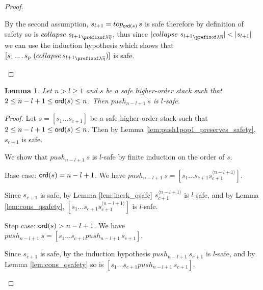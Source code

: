 \documentclass[a4paper]{article}
\newtheorem{lemma}{Lemma}[section]
\theoremstyle{remark}
\theoremstyle{definition}
\begin{document}
\begin{proof}
\begin{itemize}
By the second assumption, $s_{l+1} = top_{{\sf ord}(s)}\,s$ is safe therefore by definition
of safety so is $collapse~{s_{l+1}}_{\prefixof\lambda\overline\eta}$, thus
since $|collapse~{s_{l+1}}_{\prefixof\lambda\overline\eta}| < |s_{l+1}|$ we can use the induction hypothesis which shows that $[s_1 \ldots s_p\ (collapse\, {s_{l+1}}_{\prefixof\lambda\overline\eta}) ]$ is safe.
\qedhere
\end{itemize}
\end{proof}


\begin{lemma}
\label{lem:pushj_safe_implies_l-safe} Let $n>l\geq 1$ and $s$ be a safe higher-order stack such that $2 \leq n-l+1 \leq {\sf ord}(s) \leq n$. Then $push_{n-l+1}\ s$ is $l$-safe.
\end{lemma}
\begin{proof}
Let $s=[s_1 \ldots s_{c+1}]$ be a safe higher-order stack such that $2 \leq n-l+1 \leq {\sf ord}(s) \leq n$. Then by Lemma \ref{lem:push1pop1_preserves_safety}, $s_{c+1}$ is safe.

We show that $push_{n-l+1}~s$ is $l$-safe by finite induction on the order of $s$.
    \begin{compactitem}
      \item Base case: ${\sf ord}(s) = n-l+1 $. We have
    $push_{n-l+1}~s = [ s_1 \ldots s_{c+1} s_{c+1}^{\langle n-l+1
    \rangle}]$.

    Since $s_{c+1}$ is safe,  by Lemma \ref{lem:incrk_qsafe} $s_{c+1}^{\langle n-l+1\rangle}$ is $l$-safe, and by Lemma
    \ref{lem:cons_qsafety},  $[ s_1 \ldots s_{c+1} s_{c+1}^{\langle n-l+1
    \rangle}]$ is $l$-safe.

      \item Step case: ${\sf ord}(s) > n-l+1$. We have
    $push_{n-l+1}~s = [ s_1 \ldots s_{c+1} push_{n-l+1}\,s_{c+1}]$.

    Since $s_{c+1}$ is safe, by the
    induction hypothesis $push_{n-l+1}~s_{c+1}$ is $l$-safe, and by Lemma \ref{lem:cons_qsafety} so is $[ s_1 \ldots s_{c+1} push_{n-l+1}\,s_{c+1}]$.
\qedhere
    \end{compactitem}
\end{proof}
\end{document}
